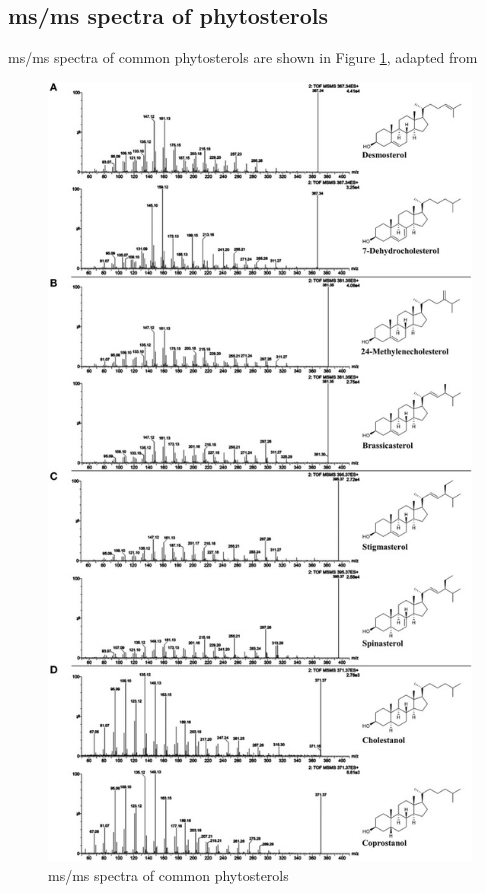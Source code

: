 \subsection{\acrfull{ms/ms} spectra of phytosterols}
\acrshort{ms/ms} spectra of common phytosterols are shown in Figure \ref{fig:sterolmsms}, adapted from \cite{sterolms}
\begin{figure}[H]
    \centering
    \includegraphics[scale=1]{images/sterolmsms.jpg}
    \caption{\acrshort{ms/ms} spectra of common phytosterols}
    \label{fig:sterolmsms}
\end{figure}
